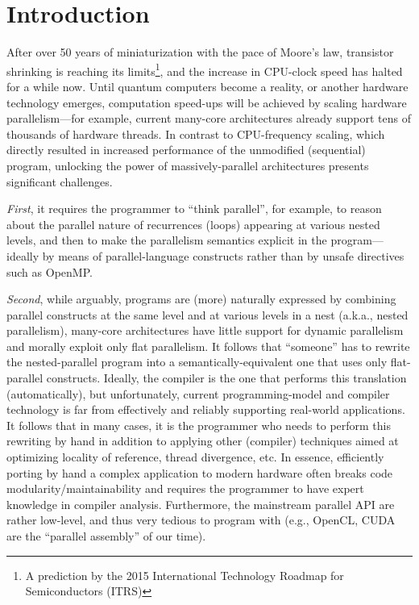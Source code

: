 \chapter{Introduction}
\label{chapter:Introduction}
After over 50 years of miniaturization with the pace of Moore's law\cite{cmcoic}, transistor shrinking is reaching its limits\footnote{A prediction by the 2015 International Technology Roadmap for Semiconductors (ITRS)}, and the increase in CPU-clock speed has halted for a while now. Until quantum computers become a reality, or another hardware technology emerges, computation speed-ups will be achieved by scaling hardware parallelism---for example, current many-core architectures already support tens of thousands of hardware threads.   In contrast to CPU-frequency scaling, which directly resulted in increased performance of the unmodified (sequential) program, unlocking the power of massively-parallel architectures presents significant challenges.   

{\em First}, it requires the programmer to ``think parallel'', for example, to reason about the parallel nature of recurrences (loops) appearing at various nested levels, and then to make the parallelism semantics explicit in the program---ideally by means of parallel-language constructs rather than by unsafe directives such as OpenMP.

{\em Second}, while arguably, programs are (more) naturally expressed by combining parallel constructs at the same level and at various levels in a nest (a.k.a., nested parallelism), many-core architectures have little support for dynamic parallelism and morally exploit only flat parallelism. It follows that ``someone'' has to rewrite the nested-parallel program into a semantically-equivalent one that uses only flat-parallel constructs. Ideally, the compiler is the one that performs this translation (automatically), but unfortunately, current programming-model and compiler technology is far from effectively and reliably supporting real-world applications. It follows that in many cases, it is the programmer who needs to perform this rewriting by hand in addition to applying other (compiler) techniques aimed at optimizing locality of reference, thread divergence, etc. In essence, efficiently porting by hand a complex application to modern hardware often breaks code modularity/maintainability and requires the programmer to have expert knowledge in compiler analysis. Furthermore, the mainstream parallel API are rather low-level, and thus very tedious to program with (e.g., OpenCL, CUDA are the ``parallel assembly'' of our time). 

